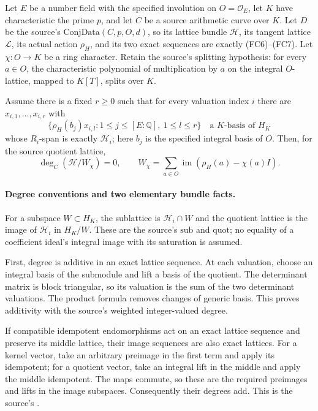 \begin{srproposition}\label{prop:faithful-character-quotient-degree-zero}
Let \(E\) be a number field with the specified involution
on \(O=\mathcal O_E\), let \(K\) have characteristic
the prime \(p\), and let \(C\) be a source arithmetic
curve over \(K\).
Let \(D\) be the source's
\(\mathrm{ConjData}(C,p,O,d)\), so its lattice bundle
\(\mathcal H\), its tangent lattice \(\mathcal L\),
its actual action \(\rho_H\), and its two exact
sequences are exactly (FC6)--(FC7).
Let \(\chi:O\to K\) be a ring character.
Retain the source's splitting hypothesis: for every
\(a\in O\), the characteristic polynomial of
multiplication by \(a\) on the integral \(O\)-lattice,
mapped to \(K[T]\), splits over \(K\).

Assume there is a fixed \(r\ge0\) such that for every
valuation index \(i\) there are \(x_{i,1},\ldots,x_{i,r}\)
with
\[
 \bigl\{\rho_H(b_j)x_{i,l}:
       1\le j\le[E:\mathbb Q],\ 1\le l\le r\bigr\}
 \quad\text{a }K\text{-basis of }H_K
\]
whose \(R_i\)-span is exactly \(\mathcal H_i\);
here \(b_j\) is the specified integral basis of \(O\).
Then, for the source quotient lattice,
\[
 \deg_C\!\left(\mathcal H/W_\chi\right)=0,\qquad
 W_\chi=\sum_{a\in O}\operatorname{im}
                                  (\rho_H(a)-\chi(a)I).
 \tag{FZ1}\label{eq:faithful-character-quotient-zero}
\]
\end{srproposition}

\paragraph{Degree conventions and two elementary bundle facts.}
For a subspace \(W\subset H_K\), the sublattice is
\(\mathcal H_i\cap W\) and the quotient lattice is
the image of \(\mathcal H_i\) in \(H_K/W\).
These are the source's \(\mathrm{sub}\) and
\(\mathrm{quot}\); no equality of a coefficient ideal's
integral image with its saturation is assumed.

First, degree is additive in an exact lattice sequence.
At each valuation, choose an integral basis of the
submodule and lift a basis of the quotient.
The determinant matrix is block triangular, so its
valuation is the sum of the two determinant valuations.
The product formula removes changes of generic basis.
This proves additivity with the source's weighted
integer-valued degree.

If compatible idempotent endomorphisms act on an exact
lattice sequence and preserve its middle lattice, their
image sequences are also exact lattices.
For a kernel vector, take an arbitrary preimage in the
first term and apply its idempotent; for a quotient
vector, take an integral lift in the middle and apply
the middle idempotent.
The maps commute, so these are the required preimages
and lifts in the image subspaces.
Consequently their degrees add.
This is the source's
.

